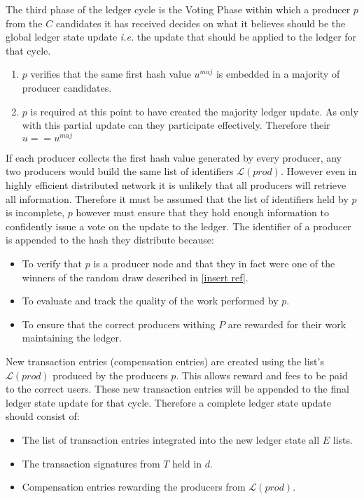 The third phase of the ledger cycle is the Voting Phase within which a producer $p$ from the $C$ candidates it has received decides on what it believes should be the global ledger state update \textit{i.e.} the update that should be applied to the ledger for that cycle.

\begin{enumerate}
\item $p$ verifies that the same first hash value $u^{maj}$ is embedded in a majority of producer candidates.
\item $p$ is required at this point to have created the majority ledger update. As only with this partial update can they participate effectively. Therefore their $u == u^{maj}$
\end{enumerate}

If each producer collects the first hash value generated by every producer, any two producers would build the same list of identifiers $\mathcal{L}(prod)$. However even in highly efficient distributed network it is unlikely that all producers will retrieve all information. Therefore it must be assumed that the list of identifiers held by $p$ is incomplete, $p$ however must ensure that they hold enough information to confidently issue a vote on the update to the ledger. The identifier of a producer is appended to the hash they distribute because:

\begin{itemize}
\item To verify that $p$ is a producer node and that they in fact were one of the winners of the random draw described in \ref{insert ref}.
\item To evaluate and track the quality of the work performed by $p$.
\item To ensure that the correct producers withing $P$ are rewarded for their work maintaining the ledger. \\

\end{itemize}

New transaction entries (compensation entries) are created using the list's  $\mathcal{L}(prod)$ produced by the producers $p$. This allows reward and fees to be paid to the correct users. These new transaction entries will be appended to the final ledger state update for that cycle. Therefore a complete ledger state update should consist of:

\begin{itemize}
\item The list of transaction entries integrated into the new ledger state all $E$ lists.
\item The transaction signatures from $T$ held in $d$.
\item Compensation entries rewarding the producers from $\mathcal{L}(prod)$.

\end{itemize}

